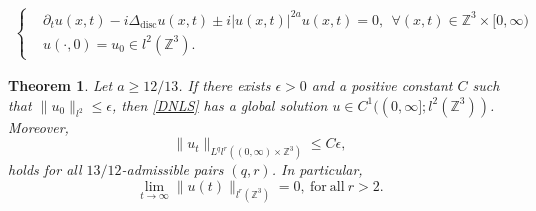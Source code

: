 \documentclass[12pt]{amsart}
\newtheorem{theorem}{Theorem}[section]
\newcommand{\Z}{\mathbb{Z}}
\begin{document}
     \begin{eqnarray}\label{DNLS}
   \left\{\begin{aligned}&\partial_tu(x,t)-i\Delta_{\mathrm{disc}}u(x,t)\pm i|u(x,t)|^{2a}u(x,t)=0,~~\forall (x,t)\in\Z^{3}\times[0,\infty) \\
    &u(\cdot,0)=u_0\in l^2(\mathbb{Z}^3).
 \end{aligned}
   \right.
   \end{eqnarray}
\begin{theorem}
    Let $a\ge 12/13$. If there exists $\epsilon>0$ and a positive constant $C$ such that $\|u_0\|_{l^2}\le \epsilon$, then \eqref{DNLS} has a global solution $u\in C^1((0,\infty];l^2(\mathbb{Z}^3))$. Moreover,
    \[
    \|u_t\|_{L^ql^r\left(\left(0,\infty\right)\times\Z^{3}\right) }\le C\epsilon,
    \]
holds for all $13/12$-admissible pairs $(q,r)$. In particular, 
\[
\lim_{t\rightarrow\infty}\|u(t)\|_{l^r(\mathbb{Z}^3)}=0, \ \mathrm{for \ all}\  r>2.
\]
\end{theorem}
\end{document}
